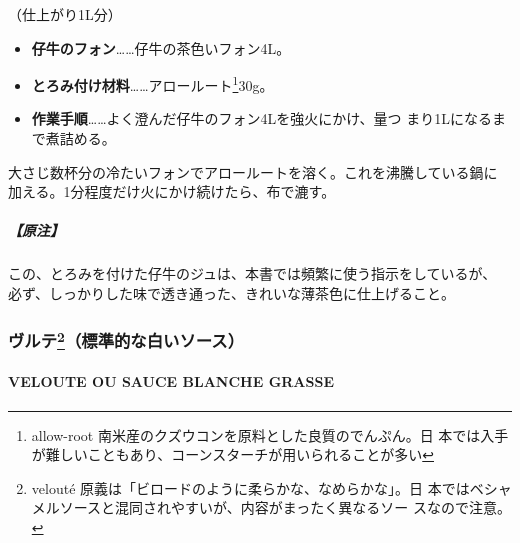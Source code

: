 \begin{recette}

（仕上がり1L分）

\begin{itemize}
\item
  \textbf{仔牛のフォン}\ldots{}\ldots{}仔牛の茶色いフォン4L。
\item
  \textbf{とろみ付け材料}\ldots{}\ldots{}アロールート\footnote{allow-root
    南米産のクズウコンを原料とした良質のでんぷん。日
    本では入手が難しいこともあり、コーンスターチが用いられることが多い}30g。
\item
  \textbf{作業手順}\ldots{}\ldots{}よく澄んだ仔牛のフォン4Lを強火にかけ、\unquart{}量つ
  まり1Lになるまで煮詰める。
\end{itemize}

大さじ数杯分の冷たいフォンでアロールートを溶く。これを沸騰している鍋に
加える。1分程度だけ火にかけ続けたら、布で漉す。

\hypertarget{ux539fux6ce8-2}{%
\subparagraph{【原注】}\label{ux539fux6ce8-2}}

この、とろみを付けた仔牛のジュは、本書では頻繁に使う指示をしているが、
必ず、しっかりした味で透き通った、きれいな薄茶色に仕上げること。

\maeaki

\hypertarget{ux30f4ux30ebux30c6102013ux6a19ux6e96ux7684ux306aux767dux3044ux30bdux30fcux30b9}{%
\subsubsection[ヴルテ（標準的な白いソース）]{\texorpdfstring{ヴルテ\footnote{velouté
  原義は「ビロードのように柔らかな、なめらかな」。日
  本ではベシャメルソースと混同されやすいが、内容がまったく異なるソー
  スなので注意。}（標準的な白いソース）}{ヴルテ（標準的な白いソース）}}\label{ux30f4ux30ebux30c6102013ux6a19ux6e96ux7684ux306aux767dux3044ux30bdux30fcux30b9}}

\hypertarget{veloute}{%
\paragraph{VELOUTE OU SAUCE BLANCHE GRASSE}\label{veloute}}


\end{recette}
